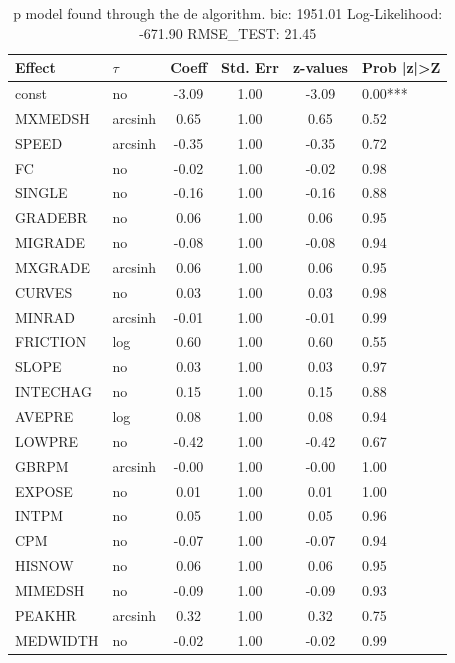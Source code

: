 \begin{table}
	\caption{p model found through the de algorithm. bic: 1951.01 Log-Likelihood: -671.90 RMSE_TEST: 21.45}
	\begin{center}
		\begin{tabular}{|l|l|c|c|c|l|}
			\hline
			Effect & $\tau$ & Coeff & Std. Err & z-values & Prob |z|>Z \\
			\hline
			const & no & -3.09 & 1.00 & -3.09 & 0.00*** \\
			\hline
			MXMEDSH & arcsinh & 0.65 & 1.00 & 0.65 & 0.52 \\
			\hline
			SPEED & arcsinh & -0.35 & 1.00 & -0.35 & 0.72 \\
			\hline
			FC & no & -0.02 & 1.00 & -0.02 & 0.98 \\
			\hline
			SINGLE & no & -0.16 & 1.00 & -0.16 & 0.88 \\
			\hline
			GRADEBR & no & 0.06 & 1.00 & 0.06 & 0.95 \\
			\hline
			MIGRADE & no & -0.08 & 1.00 & -0.08 & 0.94 \\
			\hline
			MXGRADE & arcsinh & 0.06 & 1.00 & 0.06 & 0.95 \\
			\hline
			CURVES & no & 0.03 & 1.00 & 0.03 & 0.98 \\
			\hline
			MINRAD & arcsinh & -0.01 & 1.00 & -0.01 & 0.99 \\
			\hline
			FRICTION & log & 0.60 & 1.00 & 0.60 & 0.55 \\
			\hline
			SLOPE & no & 0.03 & 1.00 & 0.03 & 0.97 \\
			\hline
			INTECHAG & no & 0.15 & 1.00 & 0.15 & 0.88 \\
			\hline
			AVEPRE & log & 0.08 & 1.00 & 0.08 & 0.94 \\
			\hline
			LOWPRE & no & -0.42 & 1.00 & -0.42 & 0.67 \\
			\hline
			GBRPM & arcsinh & -0.00 & 1.00 & -0.00 & 1.00 \\
			\hline
			EXPOSE & no & 0.01 & 1.00 & 0.01 & 1.00 \\
			\hline
			INTPM & no & 0.05 & 1.00 & 0.05 & 0.96 \\
			\hline
			CPM & no & -0.07 & 1.00 & -0.07 & 0.94 \\
			\hline
			HISNOW & no & 0.06 & 1.00 & 0.06 & 0.95 \\
			\hline
			MIMEDSH & no & -0.09 & 1.00 & -0.09 & 0.93 \\
			\hline
			PEAKHR & arcsinh & 0.32 & 1.00 & 0.32 & 0.75 \\
			\hline
			MEDWIDTH & no & -0.02 & 1.00 & -0.02 & 0.99 \\

\end{tabular}
\end{center}
\end{table}
